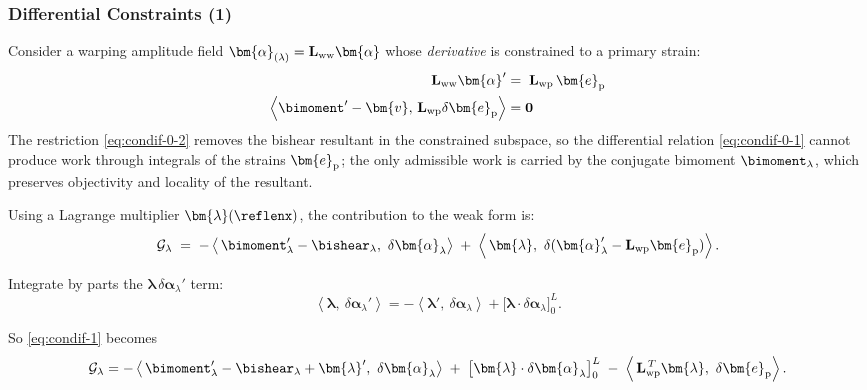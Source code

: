 
\subsubsection{Differential Constraints (1)}

Consider a warping amplitude field \(\bm{\alpha}_{(\lambda)} = \mathbf{L}_{\rm ww}\bm{\alpha}\) whose \emph{derivative} is constrained to a primary strain:
\begin{subequations}
\begin{align}
\mathbf{L}_{\rm ww}\bm{\alpha}' &=\; \mathbf{L}_{\rm wp}\,\bm{e}_{\rm p}  \label{eq:condif-0-1} \\
\left<\bimoment' - \bm{v},\, \mathbf{L}_{\rm wp}\delta\bm{e}_{\rm p}\right> &= \mathbf{0} \label{eq:condif-0-2}
\end{align}
\label{eq:condif}
\end{subequations}
%
The restriction \eqref{eq:condif-0-2} removes the bishear resultant in the constrained subspace, so the differential relation \eqref{eq:condif-0-1} cannot produce work through integrals of the strains $\bm{e}_{\rm p}$; the only admissible work is carried by the conjugate bimoment $\bimoment_{\lambda}$, which preserves objectivity and locality of the resultant. 


Using a Lagrange multiplier \(\bm{\lambda}(\reflenx)\), the contribution to the weak form is:
\begin{equation}
  \mathcal G_{\lambda}
  \;=\;
  -\left<\,\bimoment_{\lambda}' - \bishear_{\lambda},\ \delta\bm{\alpha}_{\lambda}\right>
  \;+\;
  \left<\,\bm{\lambda},\ \delta(\bm{\alpha}_{\lambda}' - \mathbf{L}_{\rm wp} \bm{e}_{\rm p})\right> .
  \label{eq:condif-1}
\end{equation}

Integrate by parts the \(\bm{\lambda}\,\delta\bm{\alpha}_{\lambda}'\) term:
\[
  \left<\bm{\lambda},\ \delta\bm{\alpha}_{\lambda}'\right>
  = -\left<\bm{\lambda}',\ \delta\bm{\alpha}_{\lambda}\right>
  + \big[\bm{\lambda}\cdot\delta\bm{\alpha}_{\lambda}\big]_{0}^{L}.
\]

So \eqref{eq:condif-1} becomes
\begin{equation}
  \mathcal G_{\lambda}
  =
  -\left<\,\bimoment_{\lambda}' - \bishear_{\lambda} + \bm{\lambda}',\ \delta\bm{\alpha}_{\lambda}\right>
  \;+\;
  \big[\bm{\lambda}\cdot\delta\bm{\alpha}_{\lambda}\big]_{0}^{L}
  \;-\;
  \left<\,\mathbf{L}_{\rm wp}^{\,T}\bm{\lambda},\ \delta \bm{e}_{\rm p}\right> .
  \label{eq:condif-2}
\end{equation}

